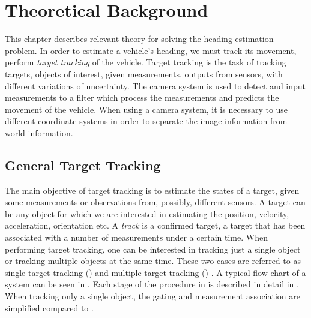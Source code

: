 \chapter{Theoretical Background}
\label{cha:theory}

This chapter describes relevant theory for solving the heading estimation problem.
In order to estimate a vehicle's heading, we must track its movement, \ie perform \textit{target tracking} of the vehicle.
Target tracking is the task of tracking targets, objects of interest, given measurements, outputs from sensors, with different variations of uncertainty.
The camera system is used to detect and input measurements to a filter which process the measurements and predicts the movement of the vehicle.
When using a camera system, it is necessary to use different coordinate systems in order to separate the image information from world information.

\section{General Target Tracking}
The main objective of target tracking is to estimate the states of a target, given some measurements or observations from, possibly, different sensors.
A target can be any object for which we are interested in estimating \eg the position, velocity, acceleration, orientation etc.
A \textit{track} is a confirmed target, \ie a target that has been associated with a number of measurements under a certain time.
When performing target tracking, one can be interested in tracking just a single object or tracking multiple objects at the same time.
These two cases are referred to as single-target tracking (\abbrSTT) and multiple-target tracking (\abbrMTT) \cite{Blackman:1999}.
A typical flow chart of a \abbrMTT system can be seen in .
Each stage of the procedure in  is described in detail in .
When tracking only a single object, the gating and measurement association are simplified compared to \abbrMTT.

